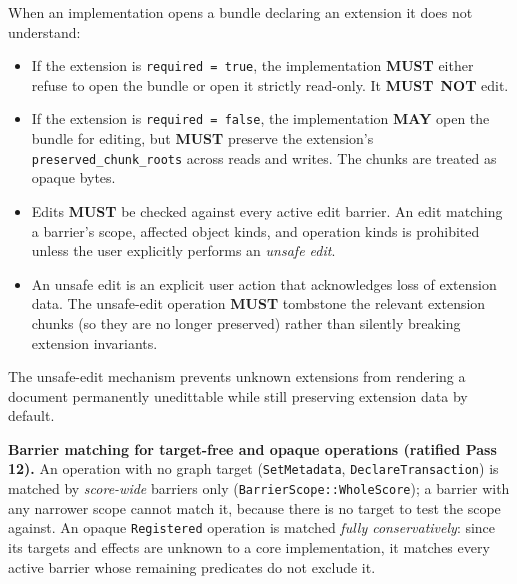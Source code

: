 \documentclass[11pt,letterpaper]{report}
\newcounter{requirement}[chapter]
\newcommand{\MUST}{\textbf{MUST}}
\newcommand{\MUSTNOT}{\textbf{MUST}\nobreak\ \textbf{NOT}}
\newcommand{\MAY}{\textbf{MAY}}
\begin{document}
\begin{requirement}
  \label{req:format:unknown-extension-preservation}
  When an implementation opens a bundle declaring an extension it
  does not understand:

  \begin{itemize}
    \item If the extension is \texttt{required = true}, the
      implementation \MUST{} either refuse to open the bundle or
      open it strictly read-only. It \MUSTNOT{} edit.
    \item If the extension is \texttt{required = false}, the
      implementation \MAY{} open the bundle for editing, but \MUST{}
      preserve the extension's \texttt{preserved\_chunk\_roots}
      across reads and writes. The chunks are treated as opaque
      bytes.
    \item Edits \MUST{} be checked against every active edit
      barrier. An edit matching a barrier's scope, affected object
      kinds, and operation kinds is prohibited unless the user
      explicitly performs an \emph{unsafe edit}.
    \item An unsafe edit is an explicit user action that
      acknowledges loss of extension data. The unsafe-edit
      operation \MUST{} tombstone the relevant extension chunks
      (so they are no longer preserved) rather than silently
      breaking extension invariants.
  \end{itemize}

  The unsafe-edit mechanism prevents unknown extensions from
  rendering a document permanently unedittable while still
  preserving extension data by default.
\end{requirement}

\begin{requirement}
  \label{req:format:barrier-matching}
  \textbf{Barrier matching for target-free and opaque operations
  (ratified Pass 12).}
  An operation with no graph target (\texttt{SetMetadata},
  \texttt{DeclareTransaction}) is matched by \emph{score-wide}
  barriers only (\texttt{BarrierScope::WholeScore}); a barrier with
  any narrower scope cannot match it, because there is no target to
  test the scope against. An opaque \texttt{Registered} operation is
  matched \emph{fully conservatively}: since its targets and effects
  are unknown to a core implementation, it matches every active
  barrier whose remaining predicates do not exclude it.
\end{requirement}
\end{document}
